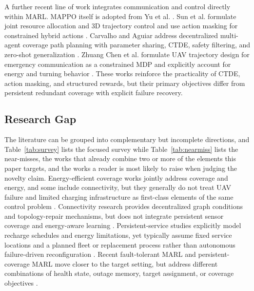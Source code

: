 \documentclass[conference]{IEEEtran}
\begin{document}
A further recent line of work integrates communication and control directly within MARL. MAPPO itself is adopted from Yu et al. \cite{yu2022}. Sun et al. formulate joint resource allocation and 3D trajectory control and use action masking for constrained hybrid actions \cite{sun2025}. Carvalho and Aguiar address decentralized multi-agent coverage path planning with parameter sharing, CTDE, safety filtering, and zero-shot generalization \cite{carvalho2026}. Zhuang Chen et al. formulate UAV trajectory design for emergency communication as a constrained MDP and explicitly account for energy and turning behavior \cite{zhuang2025}. These works reinforce the practicality of CTDE, action masking, and structured rewards, but their primary objectives differ from persistent redundant coverage with explicit failure recovery.

\subsection{Research Gap}
The literature can be grouped into complementary but incomplete directions, and Table~\ref{tab:survey} lists the focused survey while Table~\ref{tab:nearmiss} lists the near-misses, the works that already combine two or more of the elements this paper targets, and the works a reader is most likely to raise when judging the novelty claim. Energy-efficient coverage works jointly address coverage and energy, and some include connectivity, but they generally do not treat UAV failure and limited charging infrastructure as first-class elements of the same control problem \cite{liu2018,omoniwa2022}. Connectivity research provides decentralized graph conditions and topology-repair mechanisms, but does not integrate persistent sensor coverage and energy-aware learning \cite{zareh2016,basu2004}. Persistent-service studies explicitly model recharge schedules and energy limitations, yet typically assume fixed service locations and a planned fleet or replacement process rather than autonomous failure-driven reconfiguration \cite{mathew2015,arribas2023}. Recent fault-tolerant MARL and persistent-coverage MARL move closer to the target setting, but address different combinations of health state, outage memory, target assignment, or coverage objectives \cite{jiang2024,mei2026}.
\end{document}
